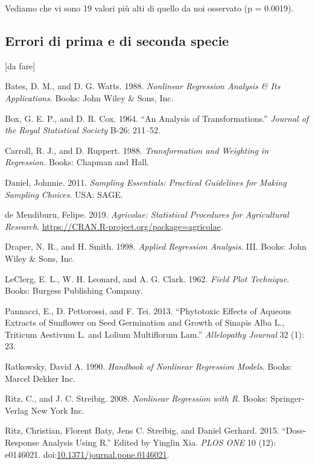 \documentclass[a4paper,12pt,oneside]{book}
\theoremstyle{definition}
\theoremstyle{definition}
\theoremstyle{definition}
\theoremstyle{remark}
\begin{document}
Vediamo che vi sono 19 valori più alti di quello da noi osservato (p =
0.0019).

\subsection{Errori di prima e di seconda
specie}\label{errori-di-prima-e-di-seconda-specie}

{[}da fare{]}

\hypertarget{refs}{}
\hypertarget{ref-bates1988_Nonlinearregressionanalysis}{}
Bates, D. M., and D. G. Watts. 1988. \emph{Nonlinear Regression Analysis
\& Its Applications.} Books: John Wiley \& Sons, Inc.

\hypertarget{ref-box1964_analysistransformations}{}
Box, G. E. P., and D. R. Cox. 1964. ``An Analysis of Transformations.''
\emph{Journal of the Royal Statistical Society} B-26: 211--52.

\hypertarget{ref-carroll1988_Transformationweightingregression}{}
Carroll, R. J., and D. Ruppert. 1988. \emph{Transformation and Weighting
in Regression.} Books: Chapman and Hall.

\hypertarget{ref-DanielSamplingessentialspractical2011}{}
Daniel, Johnnie. 2011. \emph{Sampling Essentials: Practical Guidelines
for Making Sampling Choices}. USA: SAGE.

\hypertarget{ref-de-Mendiburu:2019aa}{}
de Mendiburu, Felipe. 2019. \emph{Agricolae: Statistical Procedures for
Agricultural Research}.
\url{https://CRAN.R-project.org/package=agricolae}.

\hypertarget{ref-draper1998_Appliedregressionanalysis}{}
Draper, N. R., and H. Smith. 1998. \emph{Applied Regression Analysis}.
III. Books: John Wiley \& Sons, Inc.

\hypertarget{ref-leclerg1962_FieldPlotTechnique}{}
LeClerg, E. L., W. H. Leonard, and A. G. Clark. 1962. \emph{Field Plot
Technique}. Books: Burgess Publishing Company.

\hypertarget{ref-pannacci2013_Phytotoxiceffectsaqueous}{}
Pannacci, E., D. Pettorossi, and F. Tei. 2013. ``Phytotoxic Effects of
Aqueous Extracts of Sunflower on Seed Germination and Growth of Sinapis
Alba L., Triticum Aestivum L. and Lolium Multiflorum Lam.''
\emph{Allelopathy Journal} 32 (1): 23.

\hypertarget{ref-ratko1990Handbook}{}
Ratkowsky, David A. 1990. \emph{Handbook of Nonlinear Regression
Models}. Books: Marcel Dekker Inc.

\hypertarget{ref-ritz2008_Nonlinearregression}{}
Ritz, C., and J. C. Streibig. 2008. \emph{Nonlinear Regression with R}.
Books: Springer-Verlag New York Inc.

\hypertarget{ref-ritz2015_DoseResponseAnalysisUsing}{}
Ritz, Christian, Florent Baty, Jens C. Streibig, and Daniel Gerhard.
2015. ``Dose-Response Analysis Using R.'' Edited by Yinglin Xia.
\emph{PLOS ONE} 10 (12): e0146021.
doi:\href{https://doi.org/10.1371/journal.pone.0146021}{10.1371/journal.pone.0146021}.
\end{document}
